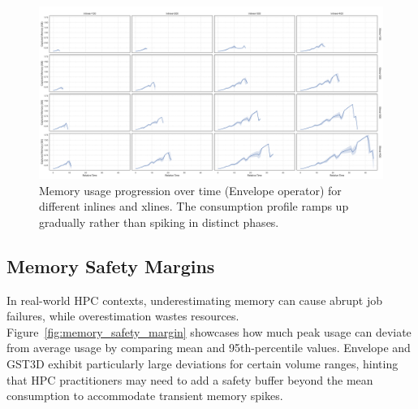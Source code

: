 \begin{figure}[htbp]
    \centering
    \includegraphics[width=\textwidth]{assets/images/05/inline_xline_memory_usage_progression_envelope}
    \caption{Memory usage progression over time (Envelope operator) for different inlines and xlines. 
        The consumption profile ramps up gradually rather than spiking in distinct phases.
        \label{fig:inline_xline_memory_usage_progression_envelope}
    }
\end{figure}

\subsection{Memory Safety Margins}
\label{subsec:memory-safety-margins}

In real-world \ac{HPC} contexts, underestimating memory can cause abrupt job failures, while overestimation wastes resources.
Figure~\ref{fig:memory_safety_margin} showcases how much peak usage can deviate from average usage by comparing mean and 95th-percentile values.
Envelope and \ac{GST3D} exhibit particularly large deviations for certain volume ranges, hinting that HPC practitioners may need to add a safety buffer beyond the mean consumption to accommodate transient memory spikes.


